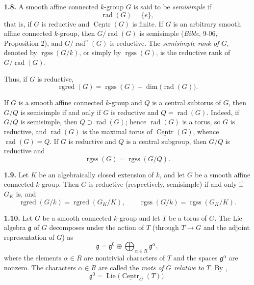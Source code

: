 \par\medskip\noindent{}\textbf{1.8.}\quad
A smooth affine connected \(k\)-group \(G\) is said to be
\emph{semisimple} if
\[
  \operatorname{rad}(G)=\{e\},
\]
that is, if \(G\) is reductive and
\(\underline{\operatorname{Centr}}(G)\) is finite.  If \(G\) is an
arbitrary smooth affine connected \(k\)-group, then
\(G/\operatorname{rad}(G)\) is semisimple (\emph{Bible}, 9-06,
Proposition 2), and \(G/\operatorname{rad}^{u}(G)\) is reductive.  The
\emph{semisimple rank of \(G\)}, denoted by
\(\operatorname{rgss}(G/k)\), or simply by \(\operatorname{rgss}(G)\), is
the reductive rank of \(G/\operatorname{rad}(G)\).

Thus, if \(G\) is reductive,
\[
  \operatorname{rgred}(G)
  =
  \operatorname{rgss}(G)+\dim\bigl(\operatorname{rad}(G)\bigr).
\]

If \(G\) is a smooth affine connected \(k\)-group and \(Q\) is a central
subtorus of \(G\), then \(G/Q\) is semisimple if and only if \(G\) is
reductive and \(Q=\operatorname{rad}(G)\).  Indeed, if \(G/Q\) is
semisimple, then \(Q\supset\operatorname{rad}(G)\); hence
\(\operatorname{rad}(G)\) is a torus, so \(G\) is reductive, and
\(\operatorname{rad}(G)\) is the maximal torus of
\(\underline{\operatorname{Centr}}(G)\), whence
\(\operatorname{rad}(G)=Q\).  If \(G\) is reductive and \(Q\) is a central
subgroup, then \(G/Q\) is reductive and
\[
  \operatorname{rgss}(G)=\operatorname{rgss}(G/Q).
\]

\par\medskip\noindent{}\textbf{1.9.}\quad
Let \(K\) be an algebraically closed extension of \(k\), and let \(G\) be
a smooth affine connected \(k\)-group.  Then \(G\) is reductive
(respectively, semisimple) if and only if \(G_K\) is, and
\[
  \operatorname{rgred}(G/k)=\operatorname{rgred}(G_K/K),
  \qquad
  \operatorname{rgss}(G/k)=\operatorname{rgss}(G_K/K).
\]

\par\medskip\noindent{}\textbf{1.10.}\quad
Let \(G\) be a smooth connected \(k\)-group and let \(T\) be a torus of
\(G\).  The Lie algebra \(\mathfrak g\) of \(G\) decomposes under the
action of \(T\) (through \(T\longrightarrow G\) and the adjoint
representation of \(G\)) as
\[
  \mathfrak g
  =
  \mathfrak g^{0}
  \oplus
  \bigoplus_{\alpha\in R}\mathfrak g^{\alpha},
\]
where the elements \(\alpha\in R\) are nontrivial characters of \(T\)
and the spaces \(\mathfrak g^{\alpha}\) are nonzero.  The characters
\(\alpha\in R\) are called the \emph{roots of \(G\) relative to \(T\)}.
By ,
\[
  \mathfrak g^{0}
  =
  \operatorname{Lie}\bigl(\underline{\operatorname{Centr}}_{G}(T)\bigr).
\]

